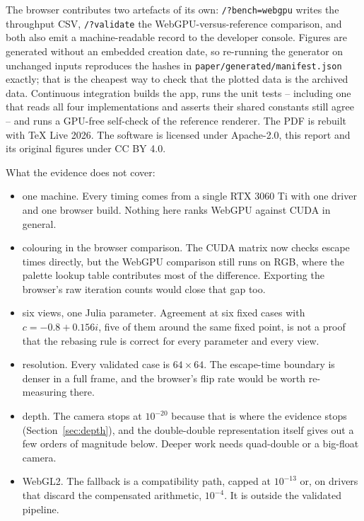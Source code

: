 \documentclass[10pt,a4paper]{article}
\begin{document}
The browser contributes two artefacts of its own: \texttt{/?bench=webgpu}
writes the throughput CSV, \texttt{/?validate} the WebGPU-versus-reference
comparison, and both also emit a machine-readable record to the developer
console. Figures are generated without an embedded creation date, so re-running
the generator on unchanged inputs reproduces the hashes in
\texttt{paper/generated/manifest.json} exactly; that is the cheapest way to
check that the plotted data is the archived data. Continuous integration builds
the app, runs the unit tests -- including one that reads all four
implementations and asserts their shared constants still agree -- and runs a
GPU-free self-check of the reference renderer. The PDF is rebuilt with TeX Live
2026. The software is licensed under Apache-2.0, this report and its original
figures under CC BY 4.0.

What the evidence does not cover:

\begin{itemize}
  \item one machine. Every timing comes from a single RTX 3060 Ti with one
        driver and one browser build. Nothing here ranks WebGPU against CUDA
        in general.
  \item colouring in the browser comparison. The CUDA matrix now checks escape
        times directly, but the WebGPU comparison still runs on RGB, where the
        palette lookup table contributes most of the difference. Exporting the
        browser's raw iteration counts would close that gap too.
  \item six views, one Julia parameter. Agreement at six fixed cases with
        \(c=-0.8+0.156i\), five of them around the same fixed point, is not a
        proof that the rebasing rule is correct for every parameter and every
        view.
  \item resolution. Every validated case is \(64\times64\). The escape-time
        boundary is denser in a full frame, and the browser's flip rate would
        be worth re-measuring there.
  \item depth. The camera stops at \(10^{-20}\) because that is where the
        evidence stops (Section~\ref{sec:depth}), and the double-double
        representation itself gives out a few orders of magnitude below.
        Deeper work needs quad-double or a big-float camera.
  \item WebGL2. The fallback is a compatibility path, capped at \(10^{-13}\)
        or, on drivers that discard the compensated arithmetic, \(10^{-4}\).
        It is outside the validated pipeline.
\end{itemize}
\end{document}
